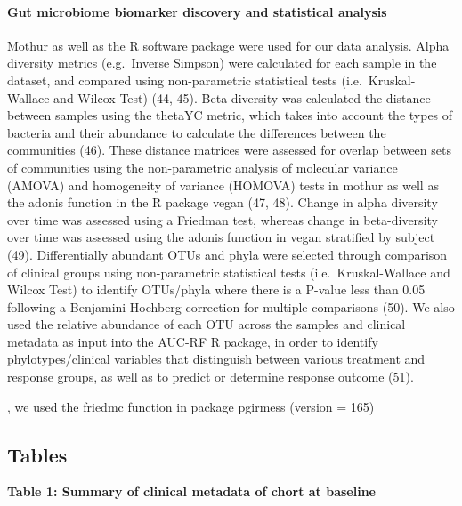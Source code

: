 \documentclass[11pt,]{article}
\let\oldparagraph\paragraph
\renewcommand{\paragraph}[1]{\oldparagraph{#1}\mbox{}}
\begin{document}
\paragraph{Gut microbiome biomarker discovery and statistical
analysis}\label{gut-microbiome-biomarker-discovery-and-statistical-analysis}

Mothur as well as the R software package were used for our data
analysis. Alpha diversity metrics (e.g.~Inverse Simpson) were calculated
for each sample in the dataset, and compared using non-parametric
statistical tests (i.e.~Kruskal-Wallace and Wilcox Test) (44, 45). Beta
diversity was calculated the distance between samples using the thetaYC
metric, which takes into account the types of bacteria and their
abundance to calculate the differences between the communities (46).
These distance matrices were assessed for overlap between sets of
communities using the non-parametric analysis of molecular variance
(AMOVA) and homogeneity of variance (HOMOVA) tests in mothur as well as
the adonis function in the R package vegan (47, 48). Change in alpha
diversity over time was assessed using a Friedman test, whereas change
in beta-diversity over time was assessed using the adonis function in
vegan stratified by subject (49). Differentially abundant OTUs and phyla
were selected through comparison of clinical groups using non-parametric
statistical tests (i.e.~Kruskal-Wallace and Wilcox Test) to identify
OTUs/phyla where there is a P-value less than 0.05 following a
Benjamini-Hochberg correction for multiple comparisons (50). We also
used the relative abundance of each OTU across the samples and clinical
metadata as input into the AUC-RF R package, in order to identify
phylotypes/clinical variables that distinguish between various treatment
and response groups, as well as to predict or determine response outcome
(51).

, we used the friedmc function in package pgirmess (version = 165)

\newpage

\subsection{Tables}\label{tables}

\textbf{Table 1: Summary of clinical metadata of chort at baseline}
\end{document}
